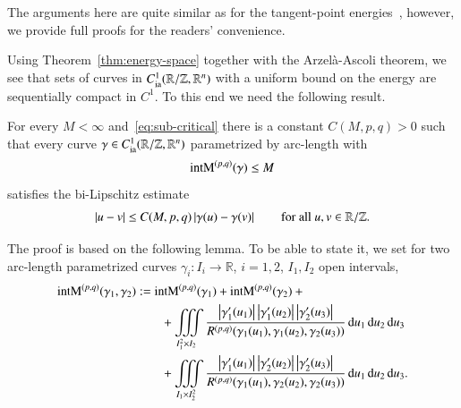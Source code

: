 \section{\secB}

The arguments here are quite similar as
for the tangent-point energies~\cite{blatt-reiter3},
however, we provide full proofs for the readers' convenience.

Using Theorem~\ref{thm:energy-space} together with
the Arzel\`a-Ascoli theorem, we see that sets of 
curves in $C_{\mathrm{ia}}^{1}(\mathbb R / \mathbb Z, \mathbb R^n)$
with a uniform bound on the energy are sequentially compact in $C^1$.
To this end we need the following result.

\begin{proposition}\label{prop:bi-Lipschitz}
 For every $M < \infty$ and~\eqref{eq:sub-critical} there is a constant $C(M,p,q)>0$ such 
 that every curve $\gamma\in C_{\mathrm{ia}}^{1}(\mathbb R / \mathbb Z, \mathbb R^n)$
 parametrized by arc-length with
 \begin{equation}\label{eq:TP<M}
  \mathrm{intM}^{(p,q)}(\gamma) \leq M
 \end{equation}
 satisfies the bi-Lipschitz estimate
 \begin{equation}\label{eq:bil}
  \left|u-v\right| \leq C(M,p,q) \left|\gamma(u) - \gamma(v)\right|
  \qquad \text{for all } u,v \in \mathbb R / \mathbb Z.
 \end{equation}
\end{proposition}

The proof is based on the following lemma.
To be able to state it,
we set for two arc-length parametrized curves $\gamma_i : I_i \rightarrow \mathbb R$, $i=1,2$,
$I_1,I_2$ open intervals,
\begin{align*}
 \mathrm{intM}^{(p,q)}(\gamma_1, \gamma_2) &:= \mathrm{intM}^{(p,q)}(\gamma_1) + \mathrm{intM}^{(p,q)}(\gamma_2) + {} \\
 &{}\qquad +\iiint\limits_{I_1^2\times I_{2}}
 \frac{\left|{\gamma}'_{1}(u_{1})\right|\left|{\gamma}'_{1}(u_{2})\right|\left|{\gamma}'_{2}(u_{3})\right|}{R^{(p,q)}(\gamma_{1}(u_{1}),\gamma_{1}(u_{2}),\gamma_{2}(u_{3}))}
 {\,\mathrm{d} u_{1}\,\mathrm{d} u_{2}\,\mathrm{d} u_{3}} \\
 &{}\qquad +\iiint\limits_{I_1\times I_{2}^{2}}
 \frac{\left|{\gamma}'_{1}(u_{1})\right|\left|{\gamma}'_{2}(u_{2})\right|\left|{\gamma}'_{2}(u_{3})\right|}{R^{(p,q)}(\gamma_{1}(u_{1}),\gamma_{2}(u_{2}),\gamma_{2}(u_{3}))}
 {\,\mathrm{d} u_{1}\,\mathrm{d} u_{2}\,\mathrm{d} u_{3}}.
\end{align*}


